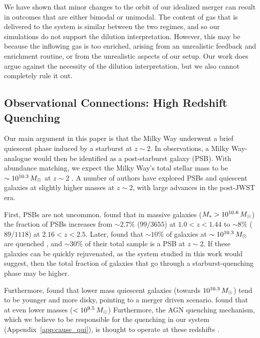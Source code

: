 We have shown that minor changes to the orbit of our idealized merger can result in outcomes that are either bimodal or unimodal. The content of gas that is delivered to the system is similar between the two regimes, and so our simulations do not support the dilution interpretation. However, this may be because the inflowing gas is too enriched, arising from an unrealistic feedback and enrichment routine, or from the unrealistic aspects of our setup. Our work does argue against the necessity of the dilution interpretation, but we also cannot completely rule it out.

\subsection{Observational Connections: High Redshift Quenching}\label{ssec:obshiz}
Our main argument in this paper is that the Milky Way underwent a brief quiescent phase induced by a starburst at $z\sim2$. In observations, a Milky Way-analogue would then be identified as a post-starburst galaxy (PSB). With abundance matching, we expect the Milky Way's total stellar mass to be $\sim10^{10.3}\,M_{\odot}$ at $z\sim2$ \citep{2013ApJ...771L..35V}. A number of authors have explored PSBs and quiescent galaxies at slightly higher masses at $z\sim2$, with large advances in the post-JWST era.

First, PSBs are not uncommon. \citet{2023ApJ...953..119P} found that in massive galaxies ($M_* > 10^{10.6}\,M_{\odot}$) the fraction of PSBs increases from $\sim2.7\%$ ($99/3655$) at $1.0 < z < 1.44$ to $\sim8\%$ ($89/1118$) at $2.16 < z < 2.5$. Later, \citet{2024arXiv240417945P} found that $\sim10\%$ of galaxies at $\sim10^{10.3}\,M_{\odot}$ are quenched \citep[consistent with][]{2013ApJ...777...18M}, and $\sim30\%$ of their total sample is a PSB at $z\sim2$. If these galaxies can be quickly rejuvenated, as the system studied in this work would suggest, then the total fraction of galaxies that go through a starburst-quenching phase may be higher.

Furthermore, \citet{2023arXiv231215012C} found that lower mass quiescent galaxies (towards $10^{10.3}\,M_{\odot}$) tend to be younger and more disky, pointing to a merger driven scenario. \citet{2023arXiv231212207A} found that at even lower masses ($<10^{9.5}\,M_{\odot}$) Furthermore, the AGN quenching mechanism, which we believe to be responsible for the quenching in our system (Appendix~\ref{app:cause_qui}), is thought to operate at these redshifts \citep[e.g.][and references therein]{2023arXiv230805795B,2024arXiv240417945P}.

